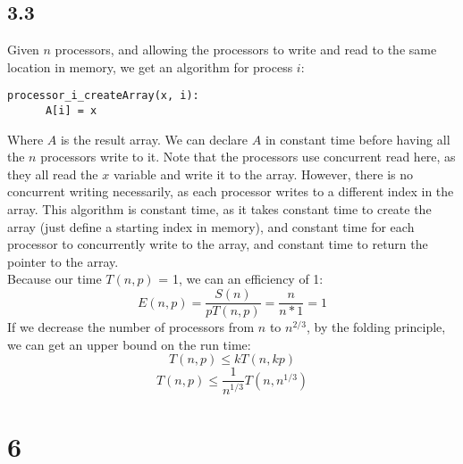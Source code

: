 \documentclass[letterpaper,notitlepage,twoside]{article}
\begin{document}
\subsection*{3.3}
Given $n$ processors, and allowing the processors to write and read to the same location in memory, we get an algorithm for process $i$:
\begin{verbatim}
processor_i_createArray(x, i):
      A[i] = x
\end{verbatim}
Where $A$ is the result array. We can declare $A$ in constant time before having all the $n$ processors write to it. Note that the processors use concurrent read here, as they all read the $x$ variable and write it to the array. However, there is no concurrent writing necessarily, as each processor writes to a different index in the array. This algorithm is constant time, as it takes constant time to create the array (just define a starting index in memory), and constant time for each processor to concurrently write to the array, and constant time to return the pointer to the array. \\
Because our time $T(n, p)$ = 1, we can an efficiency of 1:
$$E(n, p) = \frac{S(n)}{pT(n,p)} = \frac{n}{n*1} = 1$$
If we decrease the number of processors from $n$ to $n^{2/3}$, by the folding principle, we can get an upper bound on the run time:
$$T(n, p) \leq kT(n, kp)$$ 
$$T(n, p) \leq \frac{1}{n^{1/3}} T(n, n^{1/3})$$
\section*{6}
\end{document}
